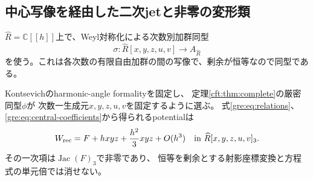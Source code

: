\subsection{中心写像を経由した二次jetと非零の変形類}
$\widehat R=\mathbb C[[h]]$上で、Weyl対称化による次数別加群同型
\[
 \sigma:\widehat R[x,y,z,u,v]\longrightarrow A_{\widehat R}
\]
を使う。これは各次数の有限自由加群の間の写像で、剰余が恒等なので同型である。

\begin{proposition}[復元potentialの二次jet]
\label{gre:prop:jet}
Kontsevichのharmonic-angle formalityを固定し、
定理\ref{cft:thm:complete}の厳密同型$\phi$が
次数一生成元$x,y,z,u,v$を固定するように選ぶ。
式\eqref{gre:eq:relations}、\eqref{gre:eq:central-coefficients}から得られるpotentialは
\begin{equation}\label{gre:eq:recovered-jet}
 W_{\rm rec}=F+hxyz+\frac{h^2}{3}xyz+O(h^3)
 \quad\text{in }\widehat R[x,y,z,u,v]_3.
\end{equation}
その一次項は$\operatorname{Jac}(F)_3$で非零であり、
恒等を剰余とする射影座標変換と方程式の単元倍では消せない。
\end{proposition}
